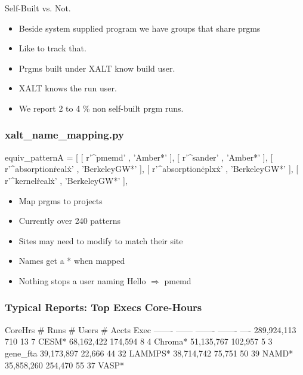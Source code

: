 \documentclass{beamer}
\begin{document}
\begin{frame}{Self-Built vs. Not.}
  \begin{itemize}
    \item Beside system supplied program we have groups that share prgms
    \item Like to track that.
    \item Prgms built under XALT know build user.
    \item XALT knows the run user.
    \item We report 2 to 4 \% non self-built prgm runs.
  \end{itemize}
\end{frame}

\begin{frame}[fragile]
    \frametitle{xalt\_name\_mapping.py}
 {\small
    \begin{semiverbatim}
equiv_patternA = [
    [ r'^pmemd'               , 'Amber*'      ],
    [ r'^sander'              , 'Amber*'      ],
    [ r'^absorption\.real\.x' , 'BerkeleyGW*' ],
    [ r'^absorption\.cplx\.x' , 'BerkeleyGW*' ],
    [ r'^kernel\.real\.x'     , 'BerkeleyGW*' ],
    \end{semiverbatim}
}
  \begin{itemize}
    \item Map prgms to projects 
    \item Currently over 240 patterns
    \item Sites may need to modify to match their site
    \item Names get a \** when mapped
    \item Nothing stops a user naming Hello $\Rightarrow$ pmemd
  \end{itemize}

\end{frame}

\begin{frame}[fragile]
    \frametitle{Typical Reports: Top Execs Core-Hours}
 {\small
    \begin{semiverbatim}
    CoreHrs   # Runs  # Users  # Accts  Exec
    -------   ------  -------  -------  ----
289,924,113      710       13        7  CESM*
 68,162,422  174,594        8        4  Chroma*
 51,135,767  102,957        5        3  gene_fta
 39,173,897   22,666       44       32  LAMMPS*
 38,714,742   75,751       50       39  NAMD*
 35,858,260  254,470       55       37  VASP*
    \end{semiverbatim}
}
\end{frame}
\end{document}
